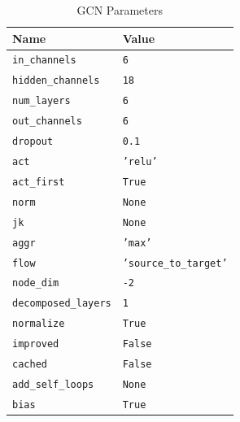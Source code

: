 \begin{table}[H]
	\centering
	\caption{\ac{GCN} Parameters}
	\begin{tabular}{ll}
		\toprule
		\textbf{Name} & \textbf{Value} \\
		\midrule
		\texttt{in\_channels} & \texttt{6} \\
		\texttt{hidden\_channels} & \texttt{18} \\
		\texttt{num\_layers} &  \texttt{6} \\
		\texttt{out\_channels} & \texttt{6} \\
		\texttt{dropout} & \texttt{0.1} \\
		\texttt{act} & \texttt{'relu'} \\
		\texttt{act\_first} & \texttt{True} \\
		\texttt{norm} & \texttt{None} \\
		\texttt{jk} & \texttt{None} \\
		\texttt{aggr} & \texttt{'max'} \\
		\texttt{flow} & \texttt{'source\_to\_target'} \\
		\texttt{node\_dim} & \texttt{-2} \\
		\texttt{decomposed\_layers} & \texttt{1} \\
		\texttt{normalize} & \texttt{True} \\
		\texttt{improved} & \texttt{False} \\
		\texttt{cached} & \texttt{False} \\
		\texttt{add\_self\_loops} & \texttt{None} \\
		\texttt{bias} & \texttt{True} \\
	\end{tabular}
	\label{tab:gcn-params-values}
\end{table}

